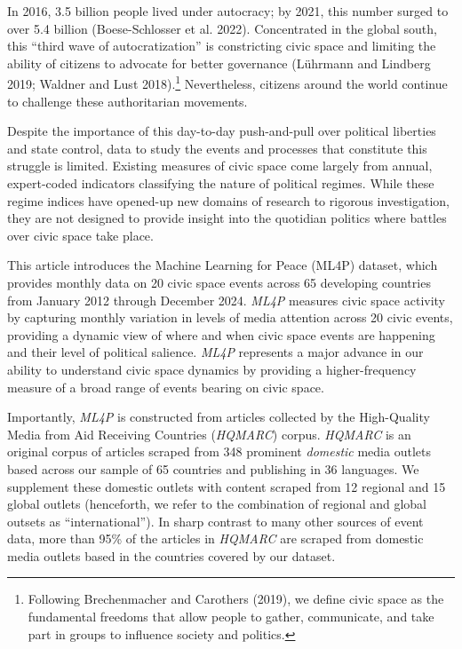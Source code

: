 \documentclass[
  letterpaper,
  DIV=11,
  numbers=noendperiod]{scrartcl}
\begin{document}
In 2016, 3.5 billion people lived under autocracy; by 2021, this number
surged to over 5.4 billion (Boese-Schlosser et al. 2022). Concentrated
in the global south, this ``third wave of autocratization'' is
constricting civic space and limiting the ability of citizens to
advocate for better governance (Lührmann and Lindberg 2019; Waldner and
Lust 2018).\footnote{Following Brechenmacher and Carothers (2019), we
  define civic space as the fundamental freedoms that allow people to
  gather, communicate, and take part in groups to influence society and
  politics.} Nevertheless, citizens around the world continue to
challenge these authoritarian movements.

Despite the importance of this day-to-day push-and-pull over political
liberties and state control, data to study the events and processes that
constitute this struggle is limited. Existing measures of civic space
come largely from annual, expert-coded indicators classifying the nature
of political regimes. While these regime indices have opened-up new
domains of research to rigorous investigation, they are not designed to
provide insight into the quotidian politics where battles over civic
space take place.

This article introduces the Machine Learning for Peace (ML4P) dataset,
which provides monthly data on 20 civic space events across 65
developing countries from January 2012 through December 2024.
\emph{ML4P} measures civic space activity by capturing monthly variation
in levels of media attention across 20 civic events, providing a dynamic
view of where and when civic space events are happening and their level
of political salience. \emph{ML4P} represents a major advance in our
ability to understand civic space dynamics by providing a
higher-frequency measure of a broad range of events bearing on civic
space.

Importantly, \emph{ML4P} is constructed from articles collected by the
High-Quality Media from Aid Receiving Countries (\emph{HQMARC}) corpus.
\emph{HQMARC} is an original corpus of articles scraped from 348
prominent \emph{domestic} media outlets based across our sample of 65
countries and publishing in 36 languages. We supplement these domestic
outlets with content scraped from 12 regional and 15 global outlets
(henceforth, we refer to the combination of regional and global outsets
as ``international''). In sharp contrast to many other sources of event
data, more than 95\% of the articles in \emph{HQMARC} are scraped from
domestic media outlets based in the countries covered by our dataset.
\end{document}
